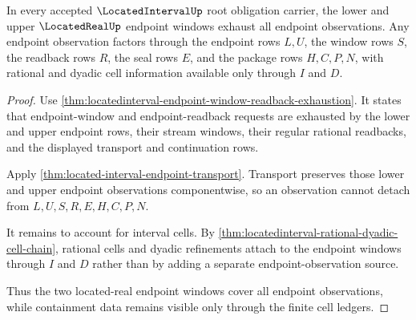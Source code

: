 \begin{theorem}
\label{thm:locatedinterval-located-real-window-coverage}
In every accepted $\LocatedIntervalUp$ root obligation carrier, the lower and upper $\LocatedRealUp$ endpoint windows exhaust all endpoint observations. Any endpoint observation factors through the endpoint rows $L,U$, the window rows $S$, the readback rows $R$, the seal rows $E$, and the package rows $H,C,P,N$, with rational and dyadic cell information available only through $I$ and $D$.
\end{theorem}
\begin{proof}
Use \autoref{thm:locatedinterval-endpoint-window-readback-exhaustion}. It states that endpoint-window and endpoint-readback requests are exhausted by the lower and upper endpoint rows, their stream windows, their regular rational readbacks, and the displayed transport and continuation rows.

Apply \autoref{thm:located-interval-endpoint-transport}. Transport preserves those lower and upper endpoint observations componentwise, so an observation cannot detach from $L,U,S,R,E,H,C,P,N$.

It remains to account for interval cells. By \autoref{thm:locatedinterval-rational-dyadic-cell-chain}, rational cells and dyadic refinements attach to the endpoint windows through $I$ and $D$ rather than by adding a separate endpoint-observation source.

Thus the two located-real endpoint windows cover all endpoint observations, while containment data remains visible only through the finite cell ledgers.
\end{proof}

